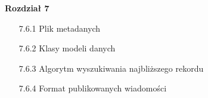 \documentclass[12pt]{przejsciowka}
\begin{document}
    \vspace{10pt}
    \noindent\textbf{Rozdział 7}
    \begin{itemize}
        \item[7.6.1] Plik metadanych \dotfill \pageref{lst:plik_metadanych}
        \item[7.6.2] Klasy modeli danych \dotfill \pageref{lst:klasy_modeli_danych}
        \item[7.6.3] Algorytm wyszukiwania najbliższego rekordu \dotfill \pageref{lst:algorytm_wyszukiwania_rekordu}
        \item[7.6.4] Format publikowanych wiadomości \dotfill \pageref{lst:format_publikowanych_wiadomosci}
    \end{itemize}
    \endgroup
    \clearpage

    
\end{document}
